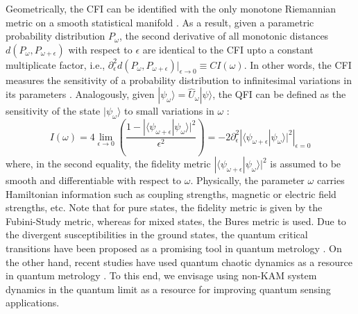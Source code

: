 \documentclass[amsmath,nobibnotes,aps,amssymb,pra, prl,aps,showpacs,superscriptaddress,twocolumn, longbibliography, reprint]{revtex4-2}
\begin{document}
Geometrically, the CFI can be identified with the only monotone Riemannian metric on a smooth statistical manifold \cite{chentsov1982statiscal, morozova1991markov}. As a result, given a parametric probability distribution $P_\omega$, the second derivative of all monotonic distances $d(P_\omega, P_{\omega+\epsilon})$ with respect to $\epsilon$ are identical to the CFI upto a constant multiplicate factor, i.e., $\partial^2_{\epsilon}d(P_\omega, P_{\omega+\epsilon})|_{\epsilon\rightarrow 0}\equiv C I(\omega)$. In other words, the CFI measures the sensitivity of a probability distribution to infinitesimal variations in its parameters \cite{meyer2021fisher}. Analogously, given $|\psi_{\omega}\rangle=\hat{U}_{\omega}|\psi\rangle$, the QFI can be defined as the sensitivity of the state $|\psi_{\omega}\rangle$ to small variations in $\omega$ \cite{helstrom1969quantum, braunstein1994statistical}:
\begin{equation}
I(\omega)= 4\lim_{\epsilon\rightarrow 0}\left( \dfrac{1-|\langle\psi_{\omega+\epsilon}|\psi_\omega\rangle|^2}{\epsilon^2} \right)
=\left. -2\partial^2_{\epsilon}|\langle \psi_{\omega+\epsilon}|\psi_\omega \rangle|^2\right|_{\epsilon=0}
\end{equation}
where, in the second equality, the fidelity metric $|\langle\psi_{\omega+\epsilon}|\psi_\omega\rangle|^2$ is assumed to be smooth and differentiable with respect to $\omega$. Physically, the parameter $\omega$ carries Hamiltonian information such as coupling strengths, magnetic or electric field strengths, etc. Note that for pure states, the fidelity metric is given by the Fubini-Study metric, whereas for mixed states, the Bures metric is used. Due to the divergent susceptibilities in the ground states, the quantum critical transitions have been proposed as a promising tool in quantum metrology \cite{zanardi2008quantum, invernizzi2008optimal, ivanov2013adiabatic, tsang2013quantum, macieszczak2016dynamical, rams2018limits, frerot2018quantum, chu2021dynamic, garbe2020critical, garbe2022critical, gietka2022understanding}. On the other hand, recent studies have used quantum chaotic dynamics as a resource in quantum metrology \cite{fiderer2018quantum, liu2021quantum}. To this end, we envisage using non-KAM system dynamics in the quantum limit as a resource for improving quantum sensing applications. 

\fi
\end{document}

